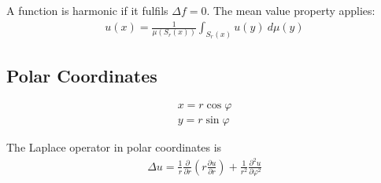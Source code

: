 A function is harmonic if it fulfils $\Delta f = 0$. The mean value property applies:
\begin{align*}
	u(x) = \frac{1}{\mu(S_r(x))}\int_{S_r(x)}u(y)\ d\mu(y)
\end{align*}

\subsection{Polar Coordinates}
\begin{align*}
	x = r\cos \varphi \\
	y = r\sin \varphi
\end{align*}

The Laplace operator in polar coordinates is
\begin{align*}
	\Delta u = \frac{1}{r}\frac{\partial}{\partial r}
	\left(r\frac{\partial u}{\partial r}\right)
	+\frac{1}{r^2}\frac{\partial^2 u}{\partial \varphi^2}
\end{align*}
